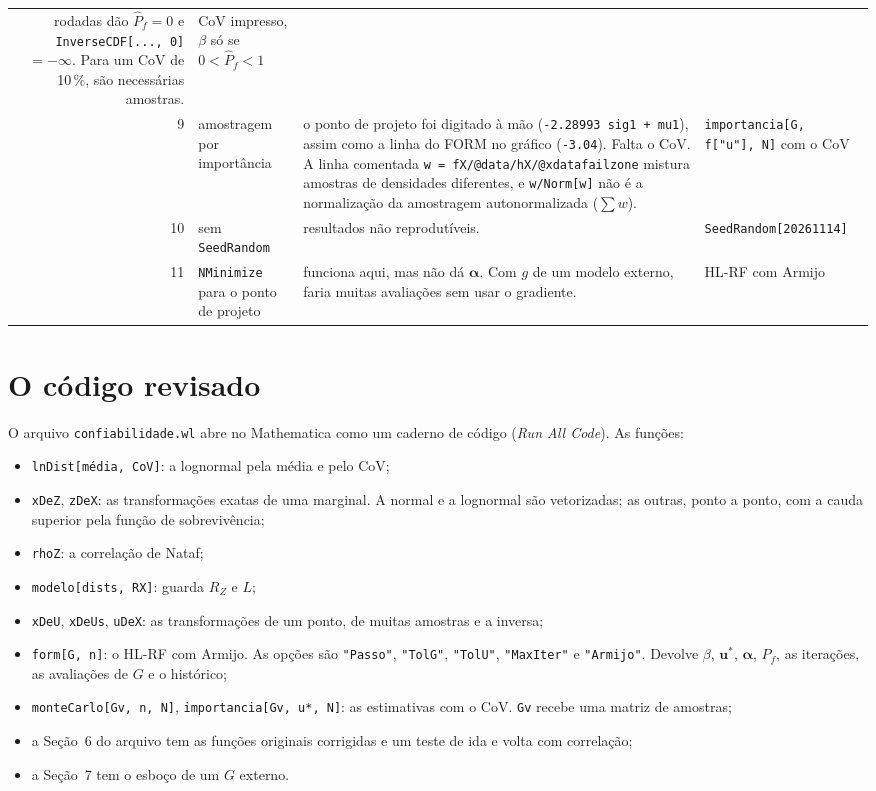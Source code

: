 \documentclass[11pt,a4paper]{article}
\begin{document}
\begin{table}[H]
\begin{tabular}{@{}r L{3.9cm} L{6.6cm} L{4.6cm}@{}}
  rodadas dão $\hat P_f = 0$ e \texttt{InverseCDF[..., 0]} $= -\infty$. Para um CoV de 10\,\%, são necessárias
  \pUmNmcDez{} amostras. & CoV impresso, $\beta$ só se $0 < \hat P_f < 1$ \\
9 & amostragem por importância &
  o ponto de projeto foi digitado à mão (\texttt{-2.28993 sig1 + mu1}), assim como a linha do FORM no gráfico
  (\texttt{-3.04}). Falta o CoV. A linha comentada \texttt{w = fX/@data/hX/@xdatafailzone} mistura amostras de
  densidades diferentes, e \texttt{w/Norm[w]} não é a normalização da amostragem autonormalizada ($\sum w$). &
  \texttt{importancia[G, f["u"], N]} com o CoV \\
10 & sem \texttt{SeedRandom} & resultados não reprodutíveis. & \texttt{SeedRandom[20261114]} \\
11 & \texttt{NMinimize} para o ponto de projeto &
  funciona aqui, mas não dá $\bm\alpha$. Com $g$ de um modelo externo, faria muitas avaliações sem usar o gradiente. &
  HL-RF com Armijo \\
\bottomrule
\end{tabular}
\end{table}

\section{O código revisado}
\label{sec:codigo}

O arquivo \texttt{confiabilidade.wl} abre no Mathematica como um caderno de código (\emph{Run All Code}). As funções:
\begin{itemize}
  \item \texttt{lnDist[média, CoV]}: a lognormal pela média e pelo CoV;
  \item \texttt{xDeZ}, \texttt{zDeX}: as transformações exatas de uma marginal. A normal e a lognormal são vetorizadas;
    as outras, ponto a ponto, com a cauda superior pela função de sobrevivência;
  \item \texttt{rhoZ}: a correlação de Nataf;
  \item \texttt{modelo[dists, RX]}: guarda $R_Z$ e $L$;
  \item \texttt{xDeU}, \texttt{xDeUs}, \texttt{uDeX}: as transformações de um ponto, de muitas amostras e a inversa;
  \item \texttt{form[G, n]}: o HL-RF com Armijo. As opções são \texttt{"Passo"}, \texttt{"TolG"}, \texttt{"TolU"},
    \texttt{"MaxIter"} e \texttt{"Armijo"}. Devolve $\beta$, $\bm u^*$, $\bm\alpha$, $P_f$, as iterações, as avaliações
    de $G$ e o histórico;
  \item \texttt{monteCarlo[Gv, n, N]}, \texttt{importancia[Gv, u*, N]}: as estimativas com o CoV. \texttt{Gv} recebe
    uma matriz de amostras;
  \item a Seção~6 do arquivo tem as funções originais corrigidas e um teste de ida e volta com correlação;
  \item a Seção~7 tem o esboço de um $G$ externo.
\end{itemize}
\end{document}
